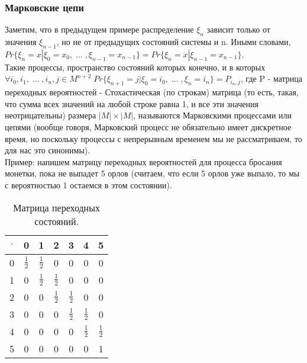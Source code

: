 \subsubsection{Марковские цепи}
Заметим, что в предыдущем примере распределение $\xi_n$ зависит только от значения $\xi_{n - 1}$, но не от предыдущих состояний системы и n. Иными словами, $Pr\{\xi_n = x | \xi_0 = x_0, \; ... \; , \xi_{n - 1} = x_{n - 1}\} = Pr\{\xi_n = x | \xi_{n - 1} = x_{n - 1}\}$.\\
Такие процессы, пространство состояний которых конечно, и в которых $\forall i_0, i_1, \; ... \; , i_{n}, j \in M^{n + 2} \; Pr\{\xi_{n + 1} = j | \xi_0 = i_0, \; ... \; , \xi_n = i_n\} = P_{i_n, j}$, где P - матрица переходных вероятностей - Стохастическая (по строкам) матрица (то есть, такая, что сумма всех значений на любой строке равна 1, и все эти значения неотрицательны) размера $|M| \times |M|$, называются Марковскими процессами или цепями (вообще говоря, Марковский процесс не обязательно имеет дискретное время, но поскольку процессы с непрерывным временем мы не рассматриваем, то для нас это синонимы).\\
Пример: напишем матрицу переходных вероятностей для процесса бросания монетки, пока не выпадет 5 орлов (считаем, что если 5 орлов уже выпало, то мы с вероятностью 1 остаемся в этом состоянии).\\
\begin{table}[H]
\caption{Матрица переходных состояний.}
\label{tabular:TransitionStatesMatrix}
\begin{center}
\begin{tabular}{|c|c|c|c|c|c|c|}
\hline
$\cdot$ & 0 & 1 & 2 & 3 & 4 & 5\\
\hline
0 & $\frac{1}{2}$ & $\frac{1}{2}$ & 0 & 0 & 0 & 0\\
\hline
1 & 0 & $\frac{1}{2}$ & $\frac{1}{2}$ & 0 & 0 & 0\\
\hline
2 & 0 & 0 & $\frac{1}{2}$ & $\frac{1}{2}$ & 0 & 0\\
\hline
3 & 0 & 0 & 0 & $\frac{1}{2}$ & $\frac{1}{2}$ & 0\\
\hline
4 & 0 & 0 & 0 & 0 & $\frac{1}{2}$ & $\frac{1}{2}$\\
\hline
5 & 0 & 0 & 0 & 0 & 0 & 1\\
\hline
\end{tabular}
\end{center}
\end{table}
